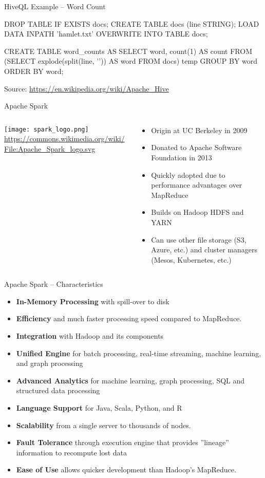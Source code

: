 \documentclass[ignorenonframetext,xcolor=x11names]{beamer}
\begin{document}
\begin{frame}[fragile]{HiveQL Example -- Word Count}
\begin{sqlcode}
DROP TABLE IF EXISTS docs;
CREATE TABLE docs (line STRING);
LOAD DATA INPATH 'hamlet.txt' 
  OVERWRITE INTO TABLE docs;
  
CREATE TABLE word_counts AS
SELECT word, count(1) AS count FROM
  (SELECT explode(split(line, '\s')) 
    AS word FROM docs) temp
GROUP BY word
ORDER BY word;
\end{sqlcode}
\small Source: \url{https://en.wikipedia.org/wiki/Apache_Hive}
\end{frame}

\begin{frame}{Apache Spark}
\begin{columns}
\begin{column}{.4\textwidth}
\texttt{[image: spark\_logo.png]}
\tiny \url{https://commons.wikimedia.org/wiki/File:Apache_Spark_logo.svg} \normalsize
\end{column}
\begin{column}{.6\textwidth}
\begin{itemize}
    \item Origin at UC Berkeley in 2009
    \item Donated to Apache Software Foundation in 2013
    \item Quickly adopted due to performance advantages over MapReduce
    \item Builds on Hadoop HDFS and YARN
    \item Can use other file storage (S3, Azure, etc.) and cluster managers (Mesos, Kubernetes, etc.)
\end{itemize}
\end{column}
\end{columns}
\end{frame}

\begin{frame}{Apache Spark -- Characteristics}
\small
\begin{itemize}
    \item \textbf{In-Memory Processing} with spill-over to disk
    \item \textbf{Efficiency} and much faster processing speed compared to MapReduce.
    \item \textbf{Integration} with Hadoop and its components
    \item \textbf{Unified Engine} for batch processing, real-time streaming, machine learning, and graph processing
    \item \textbf{Advanced Analytics} for machine learning, graph processing, SQL and structured data processing
    \item \textbf{Language Support} for Java, Scala, Python, and R
    \item \textbf{Scalability} from a single server to thousands of nodes.
    \item \textbf{Fault Tolerance} through execution engine that provides ''lineage'' information to recompute lost data
    \item \textbf{Ease of Use} allows quicker development than Hadoop's MapReduce.
\end{itemize}
\end{frame}
\end{document}

